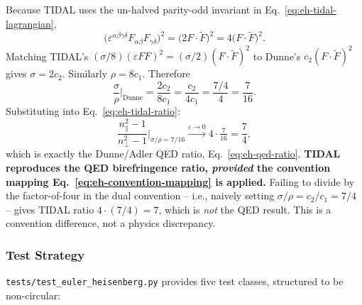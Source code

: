Because TIDAL uses the un-halved parity-odd invariant in Eq.~\eqref{eq:eh-tidal-lagrangian},
\begin{equation}
  \big(\varepsilon^{\alpha\beta\gamma\delta} F_{\alpha\beta} F_{\gamma\delta}\big)^2
  = \big(2 F\cdot\tilde{F}\big)^2
  = 4 \big(F\cdot\tilde{F}\big)^2.
\end{equation}
Matching TIDAL's $(\sigma/8)(\varepsilon F F)^2 = (\sigma/2)(F\cdot\tilde{F})^2$ to Dunne's $c_2 (F\cdot\tilde{F})^2$ gives $\sigma = 2c_2$. Similarly $\rho = 8c_1$. Therefore
\begin{equation}
  \frac{\sigma}{\rho}\bigg|_{\mathrm{Dunne}}
  = \frac{2 c_2}{8 c_1} = \frac{c_2}{4 c_1} = \frac{7/4}{4} = \frac{7}{16}.
  \label{eq:eh-convention-mapping}
\end{equation}
Substituting into Eq.~\eqref{eq:eh-tidal-ratio}:
\begin{equation}
  \frac{n_\parallel^2-1}{n_\perp^2-1}\bigg|_{\sigma/\rho = 7/16}
  \xrightarrow{\varepsilon \to 0} 4 \cdot \tfrac{7}{16} = \frac{7}{4},
\end{equation}
which is exactly the Dunne/Adler QED ratio, Eq.~\eqref{eq:eh-qed-ratio}. \textbf{TIDAL reproduces the QED birefringence ratio, \emph{provided} the convention mapping Eq.~\eqref{eq:eh-convention-mapping} is applied.} Failing to divide by the factor-of-four in the dual convention -- i.e., naively setting $\sigma/\rho = c_2/c_1 = 7/4$ -- gives TIDAL ratio $4 \cdot (7/4) = 7$, which is \emph{not} the QED result. This is a convention difference, not a physics discrepancy.

\subsubsection{Test Strategy}
\label{sec:pr-eh-tests}

\texttt{tests/test\_euler\_heisenberg.py} provides five test classes, structured to be non-circular:

